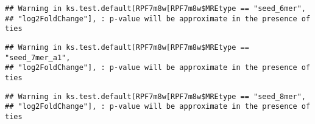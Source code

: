 \documentclass[
]{article}
\newenvironment{Shaded}{\begin{snugshade}}{\end{snugshade}}
\newcommand{\FunctionTok}[1]{\textcolor[rgb]{0.13,0.29,0.53}{\textbf{#1}}}
\newcommand{\NormalTok}[1]{#1}
\newcommand{\OtherTok}[1]{\textcolor[rgb]{0.56,0.35,0.01}{#1}}
\newcommand{\SpecialCharTok}[1]{\textcolor[rgb]{0.81,0.36,0.00}{\textbf{#1}}}
\newcommand{\StringTok}[1]{\textcolor[rgb]{0.31,0.60,0.02}{#1}}
\begin{document}
\begin{verbatim}
## Warning in ks.test.default(RPF7m8w[RPF7m8w$MREtype == "seed_6mer",
## "log2FoldChange"], : p-value will be approximate in the presence of ties
\end{verbatim}

\begin{Shaded}
\end{Shaded}

\begin{verbatim}
## Warning in ks.test.default(RPF7m8w[RPF7m8w$MREtype == "seed_7mer_a1",
## "log2FoldChange"], : p-value will be approximate in the presence of ties
\end{verbatim}

\begin{Shaded}
\end{Shaded}

\begin{verbatim}
## Warning in ks.test.default(RPF7m8w[RPF7m8w$MREtype == "seed_8mer",
## "log2FoldChange"], : p-value will be approximate in the presence of ties
\end{verbatim}

\begin{Shaded}
\end{Shaded}
\end{document}
